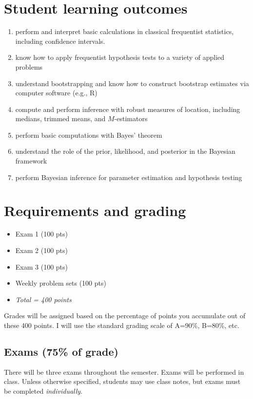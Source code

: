 \documentclass[10pt]{article}
\begin{document}
\section*{Student learning outcomes}
\label{sec-4}

\begin{enumerate}
\item perform and interpret basic calculations in classical frequentist statistics, including confidence intervals.
\item know how to apply frequentist hypothesis tests to a variety of applied problems
\item understand bootstrapping and know how to construct bootstrap estimates via computer software (e.g., R)
\item compute and perform inference with robust measures of location, including medians, trimmed means, and $M$-estimators
\item perform basic computations with Bayes' theorem
\item understand the role of the prior, likelihood, and posterior in the Bayesian framework
\item perform Bayesian inference for parameter estimation and hypothesis testing
\end{enumerate}

\section*{Requirements and grading}
\label{sec-5}

\begin{itemize}
\item Exam 1 (100 pts)
\item Exam 2 (100 pts)
\item Exam 3 (100 pts)
\item Weekly problem sets (100 pts)
\item \emph{Total = 400 points}
\end{itemize}

Grades will be assigned based on the percentage of points you accumulate out of these 400 points.  I will use the standard grading scale of A=90\%, B=80\%, etc.

\subsection*{Exams (75\% of grade)}
\label{sec-5-1}
There will be three exams throughout the semester.  Exams will be performed in class.  Unless otherwise specified, students may use class notes, but exams must be completed \emph{individually}.  
\end{document}
